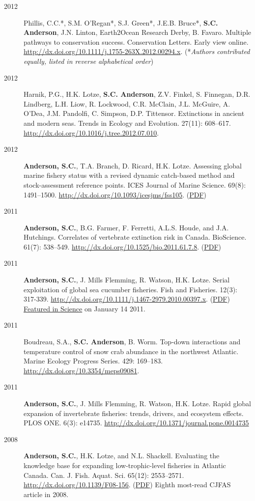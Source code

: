 \begin{description}
\item[2012]
Phillis, C.C.*, S.M. O'Regan*, S.J. Green*, J.E.B. Bruce*, \textbf{S.C.
Anderson}, J.N. Linton, Earth2Ocean Research Derby, B. Favaro. Multiple
pathways to conservation success. Conservation Letters. Early view
online. \url{http://dx.doi.org/10.1111/j.1755-263X.2012.00294.x}.
(*\emph{Authors contributed equally, listed in reverse alphabetical
order})
\item[2012]
Harnik, P.G., H.K. Lotze, \textbf{S.C. Anderson}, Z.V. Finkel, S.
Finnegan, D.R. Lindberg, L.H. Liow, R. Lockwood, C.R. McClain, J.L.
McGuire, A. O'Dea, J.M. Pandolfi, C. Simpson, D.P. Tittensor.
Extinctions in ancient and modern seas. Trends in Ecology and Evolution.
27(11): 608--617. \url{http://dx.doi.org/10.1016/j.tree.2012.07.010}.
\item[2012]
\textbf{Anderson, S.C.}, T.A. Branch, D. Ricard, H.K. Lotze. Assessing
global marine fishery status with a revised dynamic catch-based method
and stock-assessment reference points. ICES Journal of Marine Science.
69(8): 1491--1500. \url{http://dx.doi.org/10.1093/icesjms/fss105}.
(\href{http://icesjms.oxfordjournals.org/cgi/reprint/fss105?ijkey=pFRzMGEDycomI3X\&keytype=ref}{PDF})
\item[2011]
\textbf{Anderson, S.C.}, B.G. Farmer, F. Ferretti, A.L.S. Houde, and
J.A. Hutchings. Correlates of vertebrate extinction risk in Canada.
BioScience. 61(7): 538--549.
\url{http://dx.doi.org/10.1525/bio.2011.61.7.8}.
(\href{papers/Anderson_etal_2011_BioScience_with_supplement.pdf}{PDF})
\item[2011]
\textbf{Anderson, S.C.}, J. Mills Flemming, R. Watson, H.K. Lotze.
Serial exploitation of global sea cucumber fisheries. Fish and
Fisheries. 12(3): 317-339.
\url{http://dx.doi.org/10.1111/j.1467-2979.2010.00397.x}.
(\href{papers/Anderson_etal_2011_seacucumbers_with_supplement.pdf}{PDF})
\href{http://www.sciencemag.org/content/331/6014/129.1.full}{Featured in
Science} on January 14 2011.
\item[2011]
Boudreau, S.A., \textbf{S.C. Anderson}, B. Worm. Top-down interactions
and temperature control of snow crab abundance in the northwest
Atlantic. Marine Ecology Progress Series. 429: 169--183.
\url{http://dx.doi.org/10.3354/meps09081}.
\item[2011]
\textbf{Anderson, S.C.}, J. Mills Flemming, R. Watson, H.K. Lotze. Rapid
global expansion of invertebrate fisheries: trends, drivers, and
ecosystem effects. PLOS ONE. 6(3): e14735.
\url{http://dx.doi.org/10.1371/journal.pone.0014735}
\item[2008]
\textbf{Anderson, S.C.}, H.K. Lotze, and N.L. Shackell. Evaluating the
knowledge base for expanding low-trophic-level fisheries in Atlantic
Canada. Can. J. Fish. Aquat. Sci. 65(12): 2553--2571.
\url{http://dx.doi.org/10.1139/F08-156}.
(\href{papers/Anderson_etal_2008_knowledge.pdf}{PDF}) Eighth most-read
CJFAS article in 2008.
\end{description}


